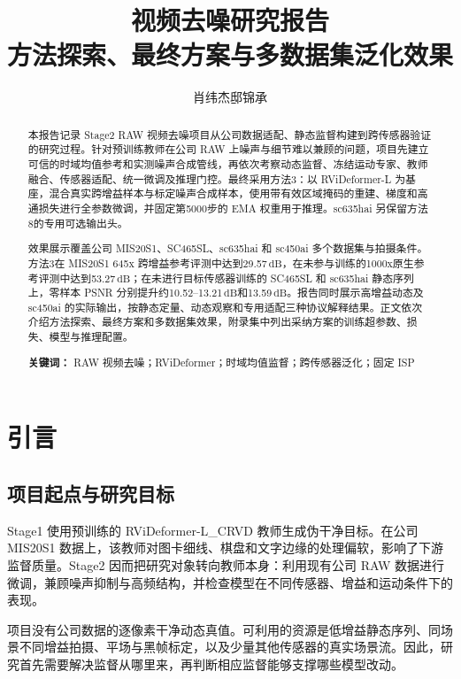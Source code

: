 \documentclass[11pt,a4paper,UTF8,fontset=fandol]{ctexart}
\title{\textbf{视频去噪研究报告}\\[0.4em]
\large 方法探索、最终方案与多数据集泛化效果}
\author{肖纬杰\quad 邸锦承}
\date{}
\newcommand{\db}{\ensuremath{\,\mathrm{dB}}}
\begin{document}
\maketitle
\begin{abstract}
\noindent
本报告记录 Stage2 RAW 视频去噪项目从公司数据适配、静态监督构建到跨传感器验证的研究过程。针对预训练教师在公司 RAW 上噪声与细节难以兼顾的问题，项目先建立可信的时域均值参考和实测噪声合成管线，再依次考察动态监督、冻结运动专家、教师融合、传感器适配、统一微调及推理门控。最终采用方法3：以 RViDeformer-L 为基座，混合真实跨增益样本与标定噪声合成样本，使用带有效区域掩码的重建、梯度和高通损失进行全参数微调，并固定第5000步的 EMA 权重用于推理。sc635hai 另保留方法8的专用可选输出头。

效果展示覆盖公司 MIS20S1、SC465SL、sc635hai 和 sc450ai 多个数据集与拍摄条件。方法3在 MIS20S1 645x 跨增益参考评测中达到29.57\db，在未参与训练的1000x原生参考评测中达到53.27\db；在未进行目标传感器训练的 SC465SL 和 sc635hai 静态序列上，零样本 PSNR 分别提升约10.52--13.21\db 和13.59\db。报告同时展示高增益动态及 sc450ai 的实际输出，按静态定量、动态观察和专用适配三种协议解释结果。正文依次介绍方法探索、最终方案和多数据集效果，附录集中列出采纳方案的训练超参数、损失、模型与推理配置。

\vspace{0.6em}
\noindent\textbf{关键词：} RAW 视频去噪；RViDeformer；时域均值监督；跨传感器泛化；固定 ISP
\end{abstract}

\newpage
{\small\setlength{\parskip}{0pt}\tableofcontents}
\newpage

\section{引言}

\subsection{项目起点与研究目标}

Stage1 使用预训练的 RViDeformer-L\_CRVD 教师生成伪干净目标。在公司 MIS20S1 数据上，该教师对图卡细线、棋盘和文字边缘的处理偏软，影响了下游监督质量。Stage2 因而把研究对象转向教师本身：利用现有公司 RAW 数据进行微调，兼顾噪声抑制与高频结构，并检查模型在不同传感器、增益和运动条件下的表现。

项目没有公司数据的逐像素干净动态真值。可利用的资源是低增益静态序列、同场景不同增益拍摄、平场与黑帧标定，以及少量其他传感器的真实场景流。因此，研究首先需要解决监督从哪里来，再判断相应监督能够支撑哪些模型改动。
\end{document}
